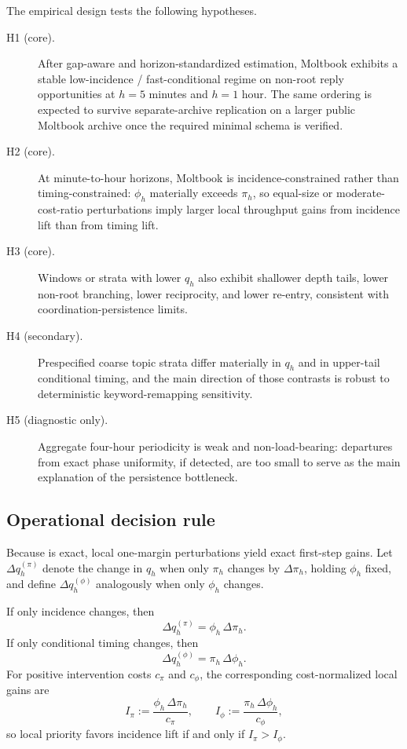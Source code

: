 The empirical design tests the following hypotheses.

\begin{description}
\item[H1 (core).]
After gap-aware and horizon-standardized estimation, Moltbook exhibits a stable
low-incidence / fast-conditional regime on non-root reply opportunities at
\(h=5\) minutes and \(h=1\) hour. The same ordering is expected to survive
separate-archive replication on a larger public Moltbook archive once the
required minimal schema is verified.

\item[H2 (core).]
At minute-to-hour horizons, Moltbook is incidence-constrained rather than
timing-constrained: \(\phi_h\) materially exceeds \(\pi_h\), so equal-size or
moderate-cost-ratio perturbations imply larger local throughput gains from
incidence lift than from timing lift.

\item[H3 (core).]
Windows or strata with lower \(q_h\) also exhibit shallower depth tails, lower
non-root branching, lower reciprocity, and lower re-entry, consistent with
coordination-persistence limits.

\item[H4 (secondary).]
Prespecified coarse topic strata differ materially in \(q_h\) and in upper-tail
conditional timing, and the main direction of those contrasts is robust to
deterministic keyword-remapping sensitivity.

\item[H5 (diagnostic only).]
Aggregate four-hour periodicity is weak and non-load-bearing: departures from
exact phase uniformity, if detected, are too small to serve as the main
explanation of the persistence bottleneck.
\end{description}

\subsection{Operational decision rule}
\label{sec:model:or-diagnostic}

Because  is exact, local one-margin
perturbations yield exact first-step gains. Let \(\Delta q_h^{(\pi)}\) denote
the change in \(q_h\) when only \(\pi_h\) changes by \(\Delta \pi_h\), holding
\(\phi_h\) fixed, and define \(\Delta q_h^{(\phi)}\) analogously when only
\(\phi_h\) changes.

\begin{proposition}
\label{prop:local-gain-priority}
If only incidence changes, then
\[
\Delta q_h^{(\pi)}=\phi_h\,\Delta \pi_h.
\]
If only conditional timing changes, then
\[
\Delta q_h^{(\phi)}=\pi_h\,\Delta \phi_h.
\]
For positive intervention costs \(c_\pi\) and \(c_\phi\), the corresponding
cost-normalized local gains are
\begin{equation}
\label{eq:horizon-throughput-delta}
I_\pi:=\frac{\phi_h\,\Delta \pi_h}{c_\pi},
\qquad
I_\phi:=\frac{\pi_h\,\Delta \phi_h}{c_\phi},
\end{equation}
so local priority favors incidence lift if and only if \(I_\pi>I_\phi\).
\end{proposition}

